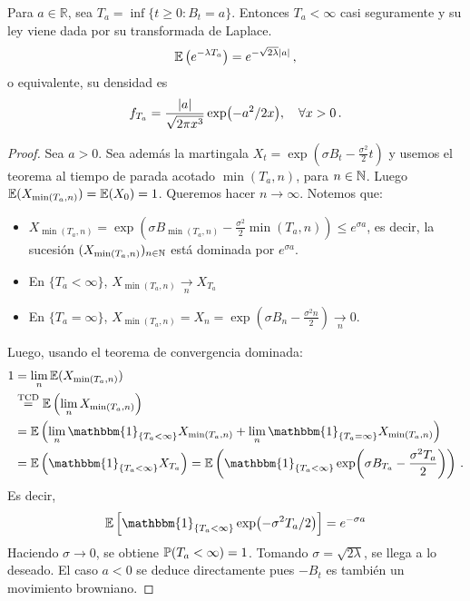 \begin{proposition}
Para $a \in \mathbb{R}$, sea $T_a = \inf \{ t \ge 0: B_t = a \}$. Entonces $T_a < \infty$ casi seguramente y su ley viene dada por su transformada de Laplace.
\begin{equation*}
        \E \left( e^{-\lambda T_{a}} \right)  = e^{-\sqrt{2\lambda} \abs{a} }\,,
\end{equation*}
o equivalente, su densidad es 
\begin{equation*}
        f_{T_{a}} = \frac{\abs{a}}{\sqrt{ 2 \pi x^3}} \exp({{-a^2}/{2x}}), ~ ~ ~ \forall x > 0\,.
\end{equation*}
\end{proposition}
\begin{proof}
\gris
Sea $a>0$. Sea además la martingala $X_t = \exp(\sigma B_t - \frac{\sigma^2}{2}t)$ y usemos el teorema al tiempo de parada acotado $\min(T_a,n)$, para $n \in \N$. Luego $\E (X_{\min(T_a,n)}) = \E(X_0) = 1$. Queremos  hacer $n \to \infty$. Notemos que:
\begin{itemize}
\item $X_{\min(T_{a},n)} = \exp\left(\sigma B_{\min(T_{a},n)} - \frac{\sigma^{2}}{2} 
        \min(T_a,n) \right)  \le e^{\sigma a}$, es decir, la sucesión $(X_{\min(T_a,n)})_{n \in \N}$ está dominada por $e^{\sigma a}$.
\item En $\{T_a < \infty \}$, $X_{\min(T_a,n)} \xrightarrow[n]{} X_{T_a}$
\item En $\{T_a = \infty \}$, $X_{\min(T_a,n)} = X_n = \exp\left( \sigma B_n - \frac{\sigma^2 n}{2} \right)  \xrightarrow[n]{} 0$.  %
\end{itemize}
Luego, usando el teorema de convergencia dominada: 
\begin{align*}
    1 &= \lim_n \E(X_{\min(T_{a},n)}) \\ 
    &\stackrel{\text{TCD}}{=} \E\left(\lim_n X_{\min(T_a,n)} \right)\\
    &= \E \left( \lim_n \mathbbm{1}_{\{T_a < \infty\}} X_{\min(T_a,n)} + 
    \lim_n \mathbbm{1}_{\{T_{a} = \infty\}} X_{\min(T_a,n)} \right)\\
    &= \E \left( \mathbbm{1}_{\{ T_a < \infty \}}  X_{T_a}  \right)  = \E \left( \mathbbm{1}_{\{T_a < \infty \}} \exp( \sigma B_{T_a} - \frac{\sigma^2 T_a}{2}) \right)\,.
\end{align*}
Es decir, 
\begin{equation*}
    \E \left[ \mathbbm{1}_{\{T_a < \infty \}} \exp(-\sigma^2 T_a / 2) \right] = e^{-\sigma a}
\end{equation*}
Haciendo $\sigma \to 0$, se obtiene $\P(T_a < \infty) = 1$. Tomando $\sigma = \sqrt{2\lambda}$, se llega a lo deseado. El caso $a < 0$ se deduce directamente pues $-B_t$ es también un movimiento browniano.\findem
\negro
\end{proof}

